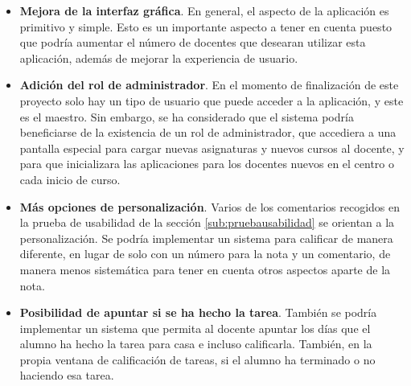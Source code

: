 \begin{itemize}
	\item \textbf{Mejora de la interfaz gráfica}. En general, el aspecto de la aplicación es primitivo y simple. Esto es un importante aspecto a tener en cuenta puesto que podría aumentar el número de docentes que desearan utilizar esta aplicación, además de mejorar la experiencia de usuario.
	\item \textbf{Adición del rol de administrador}. En el momento de finalización de este proyecto solo hay un tipo de usuario que puede acceder a la aplicación, y este es el maestro. Sin embargo, se ha considerado que el sistema podría beneficiarse de la existencia de un rol de administrador, que accediera a una pantalla especial para cargar nuevas asignaturas y nuevos cursos al docente, y para que inicializara las aplicaciones para los docentes nuevos en el centro o cada inicio de curso.
	\item \textbf{Más opciones de personalización}. Varios de los comentarios recogidos en la prueba de usabilidad de la sección \ref{sub:pruebausabilidad} se orientan a la personalización. Se podría implementar un sistema para calificar de manera diferente, en lugar de solo con un número para la nota y un comentario, de manera menos sistemática para tener en cuenta otros aspectos aparte de la nota.
	\item \textbf{Posibilidad de apuntar si se ha hecho la tarea}. También se podría implementar un sistema que permita al docente apuntar los días que el alumno ha hecho la tarea para casa e incluso calificarla. También, en la propia ventana de calificación de tareas, si el alumno ha terminado o no haciendo esa tarea.
\end{itemize}
